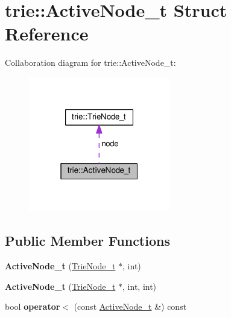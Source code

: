 \hypertarget{structtrie_1_1ActiveNode__t}{}\section{trie\+:\+:Active\+Node\+\_\+t Struct Reference}
\label{structtrie_1_1ActiveNode__t}


Collaboration diagram for trie\+:\+:Active\+Node\+\_\+t\+:
\nopagebreak
\begin{figure}[H]
\begin{center}
\leavevmode
\includegraphics[width=175pt]{structtrie_1_1ActiveNode__t__coll__graph}
\end{center}
\end{figure}
\subsection*{Public Member Functions}
\begin{DoxyCompactItemize}
\item 
{\bfseries Active\+Node\+\_\+t} (\hyperlink{classtrie_1_1TrieNode__t}{Trie\+Node\+\_\+t} $\ast$, int)\hypertarget{structtrie_1_1ActiveNode__t_a91ccfa1c782fe00e3ae4b8179b358f49}{}\label{structtrie_1_1ActiveNode__t_a91ccfa1c782fe00e3ae4b8179b358f49}

\item 
{\bfseries Active\+Node\+\_\+t} (\hyperlink{classtrie_1_1TrieNode__t}{Trie\+Node\+\_\+t} $\ast$, int, int)\hypertarget{structtrie_1_1ActiveNode__t_aab42b73cc48adf726fceb40de4b870d9}{}\label{structtrie_1_1ActiveNode__t_aab42b73cc48adf726fceb40de4b870d9}

\item 
bool {\bfseries operator$<$} (const \hyperlink{structtrie_1_1ActiveNode__t}{Active\+Node\+\_\+t} \&) const \hypertarget{structtrie_1_1ActiveNode__t_ae6397306545a778f889ae71819e030f7}{}\label{structtrie_1_1ActiveNode__t_ae6397306545a778f889ae71819e030f7}

\end{DoxyCompactItemize}
